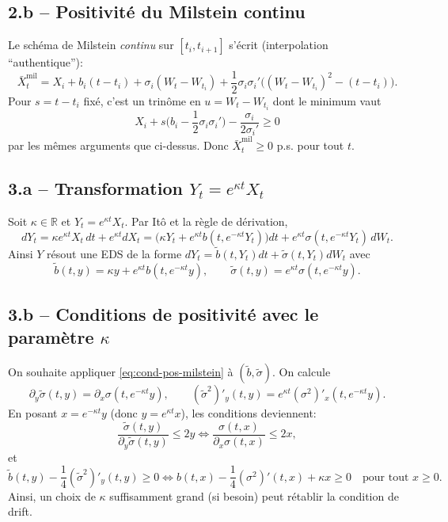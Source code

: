 \documentclass[11pt,a4paper]{article}
\newcommand{\R}{\mathbb{R}}
\newcommand{\1}{\mathbbm{1}}
\theoremstyle{plain}
\theoremstyle{definition}
\begin{document}
\subsection{2.b -- Positivité du Milstein continu}
Le schéma de Milstein \emph{continu} sur $[t_i,t_{i+1}]$ s'écrit (interpolation ``authentique''):
\[
\bar X^{\mathrm{mil}}_t
=X_i+b_i(t-t_i)+\sigma_i(W_t-W_{t_i})+\frac12\sigma_i\sigma_i'\Big((W_t-W_{t_i})^2-(t-t_i)\Big).
\]
Pour $s=t-t_i$ fixé, c'est un trinôme en $u=W_t-W_{t_i}$ dont le minimum vaut
\[
X_i+s\Big(b_i-\frac12\sigma_i\sigma_i'\Big)-\frac{\sigma_i}{2\sigma_i'}\ge 0
\]
par les mêmes arguments que ci-dessus. Donc $\bar X^{\mathrm{mil}}_t\ge 0$ p.s. pour tout $t$.

\subsection{3.a -- Transformation $Y_t=e^{\kappa t}X_t$}
Soit $\kappa\in\R$ et $Y_t=e^{\kappa t}X_t$. Par Itô et la règle de dérivation,
\[
dY_t=\kappa e^{\kappa t}X_t\,dt+e^{\kappa t}dX_t
=\Big(\kappa Y_t+e^{\kappa t}b(t,e^{-\kappa t}Y_t)\Big)dt+e^{\kappa t}\sigma(t,e^{-\kappa t}Y_t)\,dW_t.
\]
Ainsi $Y$ résout une EDS de la forme $dY_t=\tilde b(t,Y_t)dt+\tilde\sigma(t,Y_t)dW_t$ avec
\[
\tilde b(t,y)=\kappa y+e^{\kappa t}b(t,e^{-\kappa t}y),
\qquad
\tilde\sigma(t,y)=e^{\kappa t}\sigma(t,e^{-\kappa t}y).
\]

\subsection{3.b -- Conditions de positivité avec le paramètre $\kappa$}
On souhaite appliquer \eqref{eq:cond-pos-milstein} à $(\tilde b,\tilde\sigma)$.
On calcule
\[
\partial_y\tilde\sigma(t,y)=\partial_x\sigma(t,e^{-\kappa t}y),
\qquad
(\tilde\sigma^2)'_y(t,y)=e^{\kappa t}(\sigma^2)'_x(t,e^{-\kappa t}y).
\]
En posant $x=e^{-\kappa t}y$ (donc $y=e^{\kappa t}x$), les conditions deviennent:
\[
\frac{\tilde\sigma(t,y)}{\partial_y\tilde\sigma(t,y)}\le 2y
\iff
\frac{\sigma(t,x)}{\partial_x\sigma(t,x)}\le 2x,
\]
et
\[
\tilde b(t,y)-\frac14(\tilde\sigma^2)'_y(t,y)\ge 0
\iff
b(t,x)-\frac14(\sigma^2)'(t,x)+\kappa x\ge 0
\quad\text{pour tout }x\ge 0.
\]
Ainsi, un choix de $\kappa$ suffisamment grand (si besoin) peut rétablir la condition de drift.
\end{document}
